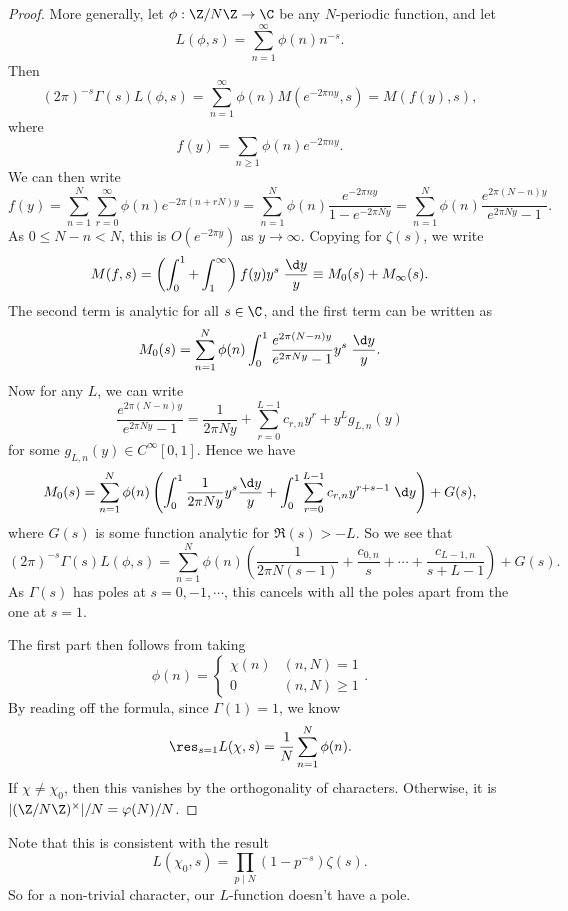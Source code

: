 \documentclass[a4paper]{article}
\begin{document}
\begin{proof}
  More generally, let $\phi: \Z/N\Z \to \C$ be any $N$-periodic function, and let
  \[
    L(\phi, s) = \sum_{n = 1}^\infty \phi(n) n^{-s}.
  \]
  Then
  \[
    (2\pi)^{-s} \Gamma(s) L(\phi,s) = \sum_{n = 1}^\infty \phi(n) M(e^{-2\pi ny}, s) = M(f(y), s),
  \]
  where
  \[
    f(y) = \sum_{n \geq 1} \phi(n) e^{-2\pi n y}.
  \]
  We can then write
  \[
    f(y) = \sum_{n = 1}^N \sum_{r = 0}^\infty \phi(n) e^{-2\pi (n + rN) y} = \sum_{n = 1}^N \phi(n) \frac{e^{-2\pi n y}}{1 - e^{-2 \pi N y}} = \sum_{n = 1}^N \phi(n) \frac{e^{2\pi (N - n) y}}{e^{2\pi Ny} - 1}.
  \]
  As $0 \leq N - n < N$, this is $O(e^{-2\pi y})$ as $y \to \infty$. Copying for $\zeta(s)$, we write
  \[
    M(f, s) = \left(\int_0^1 + \int_1^\infty\right)f(y) y^s\; \frac{\d y}{y} \equiv M_0(s) + M_\infty(s).
  \]
  The second term is analytic for all $s \in \C$, and the first term can be written as
  \[
    M_0(s) = \sum_{n = 1}^N \phi(n) \int_0^1 \frac{e^{2\pi (N -n) y}}{ e^{2\pi Ny} - 1} y^s\;\frac{\d y}{y}.
  \]
  Now for any $L$, we can write
  \[
    \frac{e^{2\pi (N - n) y}}{e^{2\pi Ny} - 1} = \frac{1}{2 \pi N y} + \sum_{r = 0}^{L - 1} c_{r, n} y^r + y^L g_{L, n}(y)
  \]
  for some $g_{L, n}(y) \in C^\infty[0, 1]$. Hence we have
  \[
    M_0(s) = \sum_{n = 1}^N \phi(n) \left(\int_0^1 \frac{1}{2\pi N y} y^s \frac{\d y}{y} + \int_0^1 \sum_{r = 0}^{L - 1} c_{r, n} y^{r + s - 1} \;\d y\right) + G(s),
  \]
  where $G(s)$ is some function analytic for $\Re(s) > -L$. So we see that
  \[
    (2\pi)^{-s} \Gamma(s) L(\phi, s) = \sum_{n = 1}^N \phi(n) \left(\frac{1}{2\pi N(s - 1)} + \frac{c_{0, n}}{s} + \cdots + \frac{c_{L - 1, n}}{s + L - 1}\right) + G(s).
  \]
  As $\Gamma(s)$ has poles at $s = 0, -1, \cdots$, this cancels with all the poles apart from the one at $s = 1$.

  The first part then follows from taking
  \[
    \phi(n) =
    \begin{cases}
      \chi(n) & (n, N) = 1\\
      0 & (n, N) \geq 1
    \end{cases}.
  \]
  By reading off the formula, since $\Gamma(1) = 1$, we know
  \[
    \res_{s = 1} L(\chi, s) = \frac{1}{N}\sum_{n = 1}^N \phi(n).
  \]
  If $\chi \not= \chi_0$, then this vanishes by the orthogonality of characters. Otherwise, it is $|(\Z/N\Z)^\times|/N = \varphi(N)/N$.
\end{proof}
Note that this is consistent with the result
\[
  L(\chi_0, s) = \prod_{p \mid N} (1 - p^{-s}) \zeta(s).
\]
So for a non-trivial character, our $L$-function doesn't have a pole.
\end{document}

